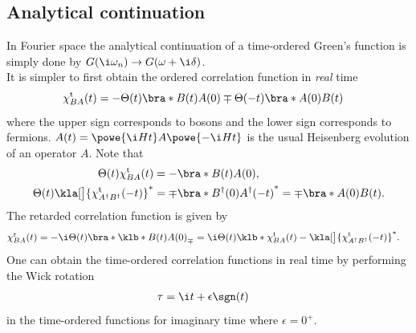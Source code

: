 \documentclass[english, parskip=full]{scrartcl}
\renewcommand{\r}{\text{r}}
\renewcommand{\t}{\text{t}}
\begin{document}
\subsection{Analytical continuation}
In Fourier space the analytical continuation of a time-ordered Green's function is simply done by $G(\i\omega_n) \rightarrow G(\omega + \i\delta)$.\\
It is simpler to first obtain the ordered correlation function in \emph{real} time 
\begin{align}
\chi_{BA}^\t(t) &= - \Theta(t) \bra*{B(t)A(0)} \mp \Theta(-t) \bra*{A(0)B(t)}
\end{align}
where the upper sign corresponds to bosons and the lower sign corresponds to fermions.
$A(t) = \powe{\i Ht}A\powe{-\i Ht}$ is the usual Heisenberg evolution of an operator $A$. 
Note that
\begin{align}
\Theta(t) \chi_{BA}^\t(t) &= - \bra*{B(t)A(0)},\\
\Theta(t) \kla[\big]{\chi_{A^\dagger B^\dagger}^\t (-t)}^\ast &= \mp \bra*{B^\dagger(0) A^\dagger (-t)}^\ast = \mp \bra*{A(0)B(t)}.
\end{align}
The retarded correlation function is given by
\begin{align}
\chi_{BA}^\r(t) &= -\i \Theta(t) \bra*{\klb*{B(t)A(0)}_\mp} = \i\Theta(t) \klb*{\chi_{BA}^\t(t) - \kla[\big]{\chi_{A^\dagger B^\dagger}^\t (-t)}^\ast}.
\end{align}
One can obtain the time-ordered correlation functions in real time by performing the Wick rotation 
\begin{align}
\tau &= \i t + \epsilon \sgn(t) \label{eqn:Wick rotation}
\end{align}
in the time-ordered functions for imaginary time where $\epsilon=0^+$.
\end{document}
